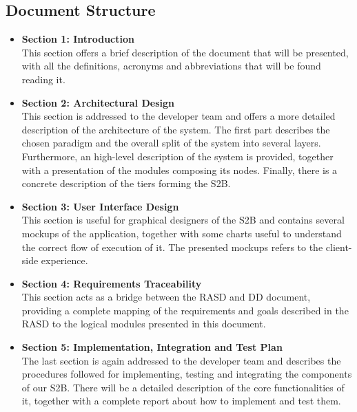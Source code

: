 \subsection{Document Structure}
\begin{itemize}
    \item \textbf{Section 1: Introduction}\\This section offers a brief description of the document that will be presented, with all the definitions, acronyms and abbreviations that will be found reading it.
    \item \textbf{Section 2: Architectural Design}\\This section is addressed to the developer team and offers a more detailed description of the architecture of the system. The first part describes the chosen paradigm and the overall split of the system into several layers. Furthermore, an high-level description of the system is provided, together with a presentation of the modules composing its nodes. Finally, there is a concrete description of the tiers forming the S2B.
    \item \textbf{Section 3: User Interface Design}\\This section is useful for graphical designers of the S2B and contains several mockups of the application, together with some charts useful to understand the correct flow of execution of it. The presented mockups refers to the client-side experience.
    \item \textbf{Section 4: Requirements Traceability}\\This section acts as a bridge between the RASD and DD document, providing a complete mapping of the requirements and goals described in the RASD to the logical modules presented in this document.
    \item \textbf{Section 5: Implementation, Integration and Test Plan}\\The last section is again addressed to the developer team and describes the procedures followed for implementing, testing and integrating the components of our S2B. There will be a detailed description of the core functionalities of it, together with a complete report about how to implement and test them.
\end{itemize}
